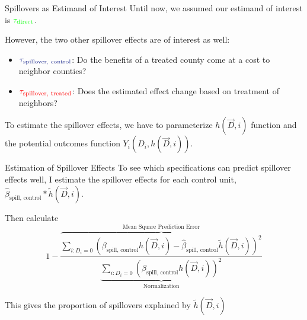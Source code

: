 \documentclass[aspectratio=169]{beamer}
\begin{document}
\begin{frame}{Spillovers as Estimand of Interest}
    Until now, we assumed our estimand of interest is $\textcolor{green}{\tau_{\text{direct}}}$.
    
    However, the two other spillover effects are of interest as well:
    \begin{itemize}
        \item $\textcolor{purple}{\tau_{\text{spillover, control}}}$: Do the benefits of a treated county come at a cost to neighbor counties? 
        
        \item $\textcolor{red}{\tau_{\text{spillover, treated}}}$: Does the estimated effect change based on treatment of neighbors? 
    \end{itemize}
    
    To estimate the spillover effects, we have to parameterize $h(\vec{D}, i)$ function and the potential outcomes function $Y_i(D_i, h(\vec{D}, i))$.
\end{frame}

\begin{frame}{Estimation of Spillover Effects}
    To see which specifications can predict spillover effects well, I estimate the spillover effects for each control unit, $\hat{\beta}_{\text{spill, control}} * \tilde{h}(\vec{D}, i)$.

    Then calculate \[ 
        1 - \frac{
                \overbrace{\sum_{i: D_i = 0} (\beta_{\text{spill, control}} h(\vec{D}, i) - \hat{\beta}_{\text{spill, control}} \tilde{h}(\vec{D}, i))^2}^{\text{Mean Square Prediction Error}}
            }{
                \underbrace{\sum_{i: D_i = 0} (\beta_{\text{spill, control}} h(\vec{D}, i))^2}_{\text{Normalization}}
            }    
    \]

    This gives the proportion of spillovers explained by $\tilde{h}(\vec{D}, i)$

\end{frame}
\end{document}
